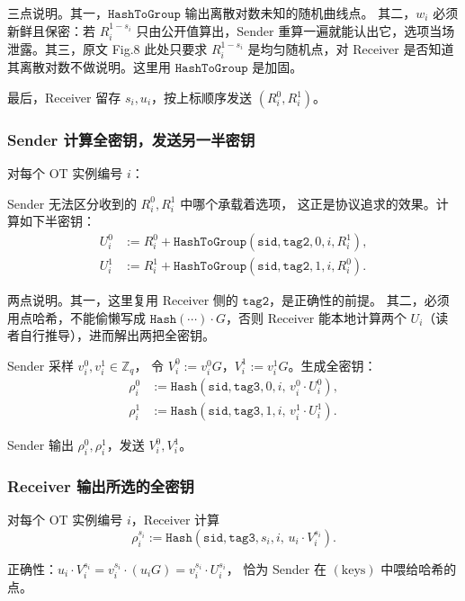 三点说明。其一，$\mathtt{HashToGroup}$ 输出离散对数未知的随机曲线点。
其二，$w_i$ 必须新鲜且保密：若 $R_i^{1-s_i}$ 只由公开值算出，Sender
重算一遍就能认出它，选项当场泄露。其三，原文 Fig.8
此处只要求 $R_i^{1-s_i}$ 是均匀随机点，对 Receiver
是否知道其离散对数不做说明。这里用 $\mathtt{HashToGroup}$ 是加固。

最后，Receiver 留存 $s_i, u_i$，按上标顺序发送 $(R_i^0, R_i^1)$。

\subsubsection{Sender 计算全密钥，发送另一半密钥}

对每个 OT 实例编号 $i$：

Sender 无法区分收到的 $R_i^0, R_i^1$ 中哪个承载着选项，
这正是协议追求的效果。计算如下半密钥：
\begin{align}U_i^0 &:= R_i^0 + \mathtt{HashToGroup}(
\mathtt{sid}, \mathtt{tag2}, 0, i,
R_i^1
),\\
U_i^1 &:= R_i^1 + \mathtt{HashToGroup}(
\mathtt{sid}, \mathtt{tag2}, 1, i,
R_i^0
).
\end{align}

两点说明。其一，这里复用 Receiver 侧的 $\mathtt{tag2}$，是正确性的前提。
其二，必须用点哈希，不能偷懒写成 $\mathtt{Hash}(\cdots)\cdot G$，否则
Receiver 能本地计算两个 $U_i$（读者自行推导），进而解出两把全密钥。

Sender 采样 $v_i^0, v_i^1 \in \mathbb{Z}_q$，
令 $V_i^0:=v_i^0 G$，$V_i^1 := v_i^1 G$。生成全密钥：
\begin{align}\rho_i^0 &:= \mathtt{Hash}(\mathtt{sid}, \mathtt{tag3}, 0, i,\,
v_i^0\cdot U_i^0), \\
\rho_i^1 &:= \mathtt{Hash}(\mathtt{sid}, \mathtt{tag3}, 1, i,\,
v_i^1\cdot U_i^1). \tag{keys}
\end{align}

Sender 输出 $\rho_i^0, \rho_i^1$，发送 $V_i^0, V_i^1$。

\subsubsection{Receiver 输出所选的全密钥}

对每个 OT 实例编号 $i$，Receiver 计算
\begin{equation}\label{eq:03-endemic-ot:1}
\rho_i^{s_i}:=\mathtt{Hash}(
\mathtt{sid}, \mathtt{tag3}, s_i, i,\,
u_i\cdot V_i^{s_i}
).
\end{equation}

正确性：$u_i\cdot V_i^{s_i} = v_i^{s_i}\cdot (u_i G) = v_i^{s_i}\cdot U_i^{s_i}$，
恰为 Sender 在 $(\text{keys})$ 中喂给哈希的点。

